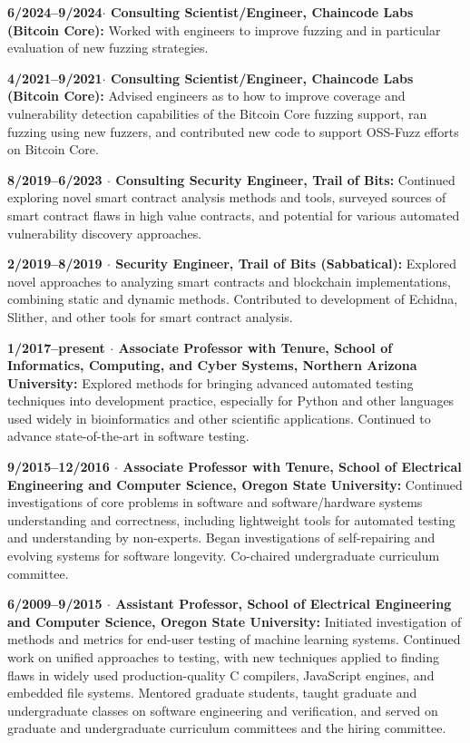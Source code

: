 \documentclass[ComputerScience]{vita}
\begin{document}
\begin{vita}
\begin{Experience}
\item {\bf 6/2024--9/2024$\cdot$ Consulting Scientist/Engineer,
    Chaincode Labs (Bitcoin Core):} Worked with engineers to improve
  fuzzing and in particular evaluation of new fuzzing strategies. 
  
\item {\bf 4/2021--9/2021$\cdot$ Consulting Scientist/Engineer,
    Chaincode Labs (Bitcoin Core):} Advised engineers as to how to
  improve coverage and vulnerability detection capabilities of the
  Bitcoin Core fuzzing support, ran fuzzing using new fuzzers, and
  contributed new code to support OSS-Fuzz efforts on Bitcoin Core. 
  
\item {\bf 8/2019--6/2023 $\cdot$ Consulting Security Engineer, Trail of Bits:} Continued exploring novel smart contract analysis methods and tools, surveyed sources of smart contract flaws in high value contracts, and potential for various automated vulnerability discovery approaches. 

\item {\bf 2/2019--8/2019 $\cdot$ Security Engineer, Trail of Bits
    (Sabbatical):} Explored novel approaches to analyzing smart
  contracts and blockchain implementations, combining static and dynamic
  methods.  Contributed to development of Echidna, Slither, and other
  tools for smart contract analysis.

\item {\bf 1/2017--present $\cdot$ Associate Professor with Tenure, School of Informatics, Computing, and Cyber Systems, Northern Arizona University:} Explored methods for bringing advanced automated testing techniques into development practice, especially for Python and other languages used widely in bioinformatics and other scientific applications.  Continued to advance state-of-the-art in software testing.

  \item {\bf 9/2015--12/2016 $\cdot$ Associate Professor with Tenure, School of Electrical Engineering and Computer Science, Oregon State University:} Continued investigations of core problems in software and software/hardware systems understanding and correctness, including lightweight tools for automated testing and understanding by non-experts.  Began investigations of self-repairing and evolving systems for software longevity.  Co-chaired undergraduate curriculum committee.

  \item {\bf 6/2009--9/2015 $\cdot$ Assistant Professor, School of
    Electrical Engineering and Computer Science, Oregon State
    University:} Initiated investigation of methods and metrics for
    end-user testing of machine learning systems.  Continued work
    on unified approaches to testing, with new techniques applied to finding flaws in widely used production-quality C compilers, JavaScript engines, and embedded file systems.  Mentored graduate
    students, taught graduate and undergraduate classes on software
    engineering and verification, and served on graduate and undergraduate curriculum committees and the hiring committee.


\end{Experience}
\end{vita}
\end{document}
